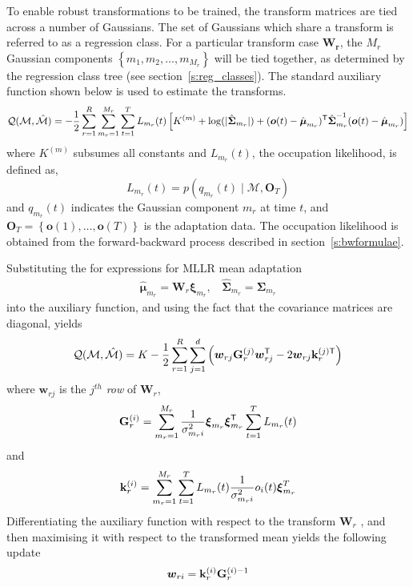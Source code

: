 To enable robust transformations to be trained, the transform matrices
are tied across a number of Gaussians. The set of Gaussians which
share a transform is referred to as a regression class.  For a
particular transform case $\bm{W_r}$, the $M_r$ Gaussian components
$\left\{m_1, m_2, \dots, m_{M_r}\right\}$ will be tied together, as
determined by the regression class tree (see
section~\ref{s:reg_classes}).  The standard auxiliary
function shown below is used to estimate the transforms.
\newcommand{\like}{L_{m_r}(t)}
\begin{eqnarray}
{\cal Q}({\cal M},{\hat{\cal M}}) = 
- \frac{1}{2}
\sum_{r=1}^R
\sum_{m_r=1}^{M_r}
\sum_{t=1}^T
\like\left[
K^{(m)}+\log(|{\hat{\bm\Sigma}}_{m_r}|)+({\bm o}(t)-
{\hat{\bm\mu}}_{m_r})^\transpose{{\hat{\bm\Sigma}}}_{m_r}^{-1}({\bm o}(t)-{\hat{\bm\mu}}_{m_r})
\right] \nonumber
\end{eqnarray}
where $K^{(m)}$ subsumes all constants and $\like$, the occupation likelihood, is defined as,
\[ 
         \like = p(q_{m_r}(t)\;|\;\mathcal{M}, \bm{O}_T)
\]
and $q_{m_r}(t)$ indicates the Gaussian component $m_r$ at time $t$,
and $\bm{O}_T = \left\{\bm{o}(1),\dots,\bm{o}(T)\right\}$ is the
adaptation data. The occupation likelihood is obtained from the
forward-backward process described in section~\ref{s:bwformulae}.


Substituting the for expressions for MLLR mean adaptation 
\begin{eqnarray}
\hat{\bm{\mu}}_{m_r} = \bm{W}_r\bm{\xi}_{m_r}, \:\:\:\: 
\hat{\bm{\Sigma}}_{m_r} = {\bm{\Sigma}}_{m_r}
\end{eqnarray}
into the auxiliary function, and using the fact that the covariance
matrices are diagonal, yields
\begin{eqnarray}
{\cal Q}({\cal M},{\hat{\cal M}}) = K
- \frac{1}{2}
\sum_{r=1}^R
\sum_{j=1}^d{
\left({{\mbox{\boldmath $w$}}}_{rj}{\bf G}^{(j)}_r{{\mbox{\boldmath $w$}}}^{\scriptstyle\sf T}_{rj} -2 {{\mbox{\boldmath $w$}}}_{rj}{\bf k}^{(j){\scriptstyle\sf T}}_r
\right)} \nonumber
\end{eqnarray}
where ${\bm{w}}_{rj}$ is the $j^{th}$ {\em row} of $\bm{W}_r$,
\begin{eqnarray}
{\bf G}^{(i)}_r=\sum_{m_r=1}^{M_r}
\frac{1}{\sigma_{m_ri}^{2}}{\bm\xi}_{m_r}{\bm\xi}^{\transpose}_{m_r}
\sum_{t=1}^T\like
\label{eq:gi_mllr}
\end{eqnarray}
and
\begin{eqnarray}
{\bf k}^{(i)}_{r} =  \sum_{m_r=1}^{M_r}\sum\limits_{t=1}^T
\like\frac{1}{\sigma^{2}_{m_ri}} 
o_i(t){\bm\xi}^{T}_{m_r}
\end{eqnarray}
Differentiating the auxiliary function with respect to the transform
${\bm W}_r$ , and then maximising it with respect to the transformed mean
yields the following update
\begin{eqnarray}
{{{\mbox{\boldmath $w$}}}}_{ri} = {\bf k}_r^{(i)}{\bf G}_r^{(i)-1} \label{eq:mllrmeansol}
\end{eqnarray}

